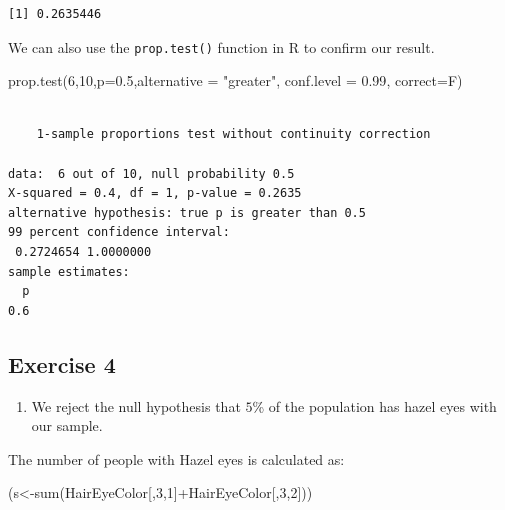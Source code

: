 \documentclass[
  letterpaper,
  DIV=11,
  numbers=noendperiod]{scrreprt}
\newenvironment{Shaded}{\begin{snugshade}}{\end{snugshade}}
\newcommand{\AttributeTok}[1]{\textcolor[rgb]{0.40,0.45,0.13}{#1}}
\newcommand{\DecValTok}[1]{\textcolor[rgb]{0.68,0.00,0.00}{#1}}
\newcommand{\FloatTok}[1]{\textcolor[rgb]{0.68,0.00,0.00}{#1}}
\newcommand{\FunctionTok}[1]{\textcolor[rgb]{0.28,0.35,0.67}{#1}}
\newcommand{\NormalTok}[1]{\textcolor[rgb]{0.00,0.23,0.31}{#1}}
\newcommand{\OtherTok}[1]{\textcolor[rgb]{0.00,0.23,0.31}{#1}}
\newcommand{\SpecialCharTok}[1]{\textcolor[rgb]{0.37,0.37,0.37}{#1}}
\newcommand{\StringTok}[1]{\textcolor[rgb]{0.13,0.47,0.30}{#1}}
\providecommand{\tightlist}{%
  \setlength{\itemsep}{0pt}\setlength{\parskip}{0pt}}\usepackage{longtable,booktabs,array}
\begin{document}
\begin{verbatim}
[1] 0.2635446
\end{verbatim}

We can also use the \texttt{prop.test()} function in R to confirm our
result.

\begin{Shaded}
\begin{Highlighting}[numbers=left,,]
\FunctionTok{prop.test}\NormalTok{(}\DecValTok{6}\NormalTok{,}\DecValTok{10}\NormalTok{,}\AttributeTok{p=}\FloatTok{0.5}\NormalTok{,}\AttributeTok{alternative =} \StringTok{"greater"}\NormalTok{, }\AttributeTok{conf.level =} \FloatTok{0.99}\NormalTok{,}
            \AttributeTok{correct=}\NormalTok{F)}
\end{Highlighting}
\end{Shaded}

\begin{verbatim}

    1-sample proportions test without continuity correction

data:  6 out of 10, null probability 0.5
X-squared = 0.4, df = 1, p-value = 0.2635
alternative hypothesis: true p is greater than 0.5
99 percent confidence interval:
 0.2724654 1.0000000
sample estimates:
  p 
0.6 
\end{verbatim}

\hypertarget{exercise-4-13}{%
\subsection*{Exercise 4}\label{exercise-4-13}}

\begin{enumerate}
\def\labelenumi{\arabic{enumi}.}
\tightlist
\item
  We reject the null hypothesis that \(5\)\% of the population has hazel
  eyes with our sample.
\end{enumerate}

The number of people with Hazel eyes is calculated as:

\begin{Shaded}
\begin{Highlighting}[numbers=left,,]
\NormalTok{(s}\OtherTok{\textless{}{-}}\FunctionTok{sum}\NormalTok{(HairEyeColor[,}\DecValTok{3}\NormalTok{,}\DecValTok{1}\NormalTok{]}\SpecialCharTok{+}\NormalTok{HairEyeColor[,}\DecValTok{3}\NormalTok{,}\DecValTok{2}\NormalTok{]))}
\end{Highlighting}
\end{Shaded}
\end{document}

